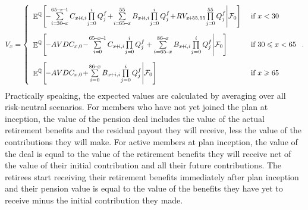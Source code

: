 \documentclass{sfuthesis}
\DeclareMathOperator{\E}{\mathbb{E}}
\numberwithin{equation}{chapter}
\begin{document}
		\begin{equation}
		\label{eq:VB_11}
		V_{x} =
		\left\{
		\begin{array}{ll}
		\vspace{0.3cm}
		\E^{\mathbb{Q}}\!\left[\!-\!\sum\limits_{i=\!30\!-\!x}^{65\!-\!x\!-\!1}C_{x\!+\!i,i}\! \prod\limits_{j=\!0}^{i}Q_{j}^{f} \!+\!\sum\limits_{i=\!65\!-\!x}^{55}B_{x\!+\!i,i}\!\prod\limits_{j=\!0}^{i}Q_{j}^{f}\!  +\! RV_{x\!+\!55,55}\!\prod\limits_{j=\!0}^{55}Q_{j}^{f}\middle| \mathcal{F}_{0} \right] &\text{ if } x<30\\
		\vspace{0.3cm}
		\E^{\mathbb{Q}}\!\left[\! -AVDC_{x,0}\! -\! \sum\limits_{i=\!0}^{65\!-\!x\!-\!1}C_{x\!+\!i,i}\! \prod\limits_{j=\!0}^{i}Q_{j}^{f} +\sum\limits_{i=65\!-\!x}^{86\!-\!x}B_{x\!+\!i,i}\!\prod\limits_{j=0}^{i}Q_{j}^{f}\middle| \mathcal{F}_{0} \right] &\text{ if } 30\leqslant x<65\\
		
		\E^{\mathbb{Q}}\!\left[\!-AVDC_{x,0}\!+\!\sum\limits_{i=0}^{86\!-\! x}B_{x\!+i,i}\!\prod\limits_{j=0}^{i}Q_{j}^f \middle| \mathcal{F}_{0} \right] &\text{ if } x\geqslant 65\\
		\end{array}
		\right..
		\end{equation}
		\justify
		Practically speaking, the expected values are calculated by averaging over all risk-neutral scenarios. 
		\justify
		For members who have not yet joined the plan at inception, the value of the pension deal includes the value of the actual retirement benefits and the residual payout they will receive, less the  value of the contributions they will make. For active members at plan inception, the value of the deal is equal to the value of the retirement benefits they will receive net of the value of their initial contribution and all their future contributions. The retirees start receiving their retirement benefits immediately after plan inception and their pension value is equal to the value of the benefits they have yet to receive minus the initial contribution they made. 
	
\end{document}
